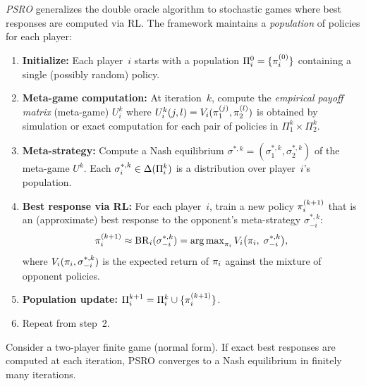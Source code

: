\documentclass[11pt,a4paper]{article}
\begin{document}
\begin{definition}
\label{def:psro}
\emph{PSRO} \citep{lanctot2017} generalizes the double oracle algorithm
to stochastic games where best responses are computed via RL.  The
framework maintains a \emph{population} of policies for each player:
\begin{enumerate}
  \item \textbf{Initialize:} Each player~$i$ starts with a population
    $\Pi_i^0 = \{\pi_i^{(0)}\}$ containing a single (possibly random)
    policy.
  \item \textbf{Meta-game computation:} At iteration~$k$, compute the
    \emph{empirical payoff matrix} (meta-game) $U_i^k$ where
    $U_i^k(j, l) = V_i(\pi_1^{(j)}, \pi_2^{(l)})$ is obtained
    by simulation or exact computation for each pair of policies in
    $\Pi_1^k \times \Pi_2^k$.
  \item \textbf{Meta-strategy:} Compute a Nash equilibrium
    $\sigma^{*,k} = (\sigma_1^{*,k}, \sigma_2^{*,k})$ of the meta-game
    $U^k$.  Each $\sigma_i^{*,k} \in \Delta(\Pi_i^k)$ is a
    distribution over player~$i$'s population.
  \item \textbf{Best response via RL:} For each player~$i$, train a new
    policy $\pi_i^{(k+1)}$ that is an (approximate) best response to
    the opponent's meta-strategy $\sigma_{-i}^{*,k}$:
    \begin{equation}
    \label{eq:psro-br}
      \pi_i^{(k+1)}
      \approx \mathrm{BR}_i(\sigma_{-i}^{*,k})
      = \operatorname{arg\,max}_{\pi_i} V_i\bigl(\pi_i,\;
        \sigma_{-i}^{*,k}\bigr),
    \end{equation}
    where $V_i(\pi_i, \sigma_{-i}^{*,k})$ is the expected return of
    $\pi_i$ against the mixture of opponent policies.
  \item \textbf{Population update:}
    $\Pi_i^{k+1} = \Pi_i^k \cup \{\pi_i^{(k+1)}\}$.
  \item Repeat from step~2.
\end{enumerate}
\end{definition}

\begin{theorem}
\label{thm:psro-convergence}
Consider a two-player finite game (normal form).  If exact best
responses are computed at each iteration, PSRO converges to a Nash
equilibrium in finitely many iterations.
\end{theorem}
\end{document}
